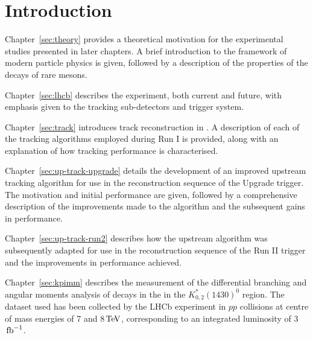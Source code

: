 \section{Introduction}
\label{sec:intro}


Chapter~\ref{sec:theory} provides a theoretical motivation for the experimental studies presented in later chapters. A brief  introduction to the framework of modern particle physics is given, followed by a description of the properties of the decays of rare \B mesons.

Chapter~\ref{sec:lhcb} describes the \lhcb experiment, both current and future, with emphasis given to the tracking sub-detectors and trigger system.

Chapter~\ref{sec:track} introduces track reconstruction in \lhcb. A description of each of the tracking algorithms employed during \lhcb Run I is provided, along with an explanation of how tracking performance is characterised.

Chapter~\ref{sec:up-track-upgrade} details the development of an improved upstream tracking algorithm for use in the reconstruction sequence of the \lhcb Upgrade trigger. The motivation and initial performance are given, followed by a comprehensive description of the improvements made to the algorithm and the subsequent gains in performance. 

Chapter~\ref{sec:up-track-run2} describes how the upstream algorithm was subsequently adapted for use in the reconstruction sequence of the \lhcb Run II trigger and the improvements in performance achieved.

Chapter~\ref{sec:kpimm} describes the measurement of the differential branching and angular moments analysis of \BdToKpimm decays in the in the $K^{*}_{0,2}(1430)^{0}$ region. The dataset used has been collected by the LHCb experiment in $pp$ collisions at centre of mass energies of 7 and 8${\mathrm{\,Te\kern -0.1em V}}$, corresponding to an integrated luminosity of 3$\mbox{\,fb}^{-1}$.